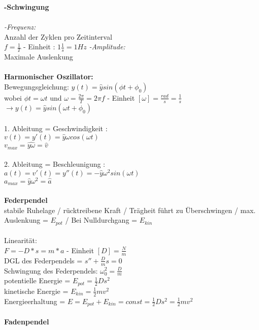 \documentclass[8pt]{article}
\begin{document}
\newpage
\noindent
{\large \textbf{-Schwingung}}\\ \\
\textit{-Frequenz:}\\ Anzahl der Zyklen pro Zeitinterval \\
$f = \frac{1}{T}$ - Einheit : $1 \frac{1}{s} = 1 Hz$ 
\textit{-Amplitude:} \\ Maximale Auslenkung \\ \\
\noindent
\textbf{Harmonischer Oszillator:}\\
Bewegungsgleichung: $y(t) = \hat{y}sin(\phi t+\phi_0) $\\
wobei $\phi t = \omega t$ und $\omega = \frac{2 \pi}{T} = 2\pi f$ - Einheit $[\omega] = \frac{rad}{s} = \frac{1}{s}$ \\
$\rightarrow y(t) = \hat{y}sin(\omega t + \phi_0)$ \\ \\
1. Ableitung = Geschwindigkeit : \\
$v(t) = y'(t) = \hat{y} \omega cos(\omega t)$ \\
$v_{max} = \hat{y \omega} = \hat{v}$ \\ \\
2. Ableitung = Beschleunigung : \\
$a(t) = v'(t) = y''(t) = -\hat{y} \omega^2 sin(\omega t)$ \\
$a_{max}=\hat{y} \omega^2 = \hat{a} $ \\ \\ 
\noindent
\textbf{Federpendel}\\
stabile Ruhelage / rücktreibene Kraft / Trägheit führt zu Überschwingen / max. Auslenkung = $E_{pot}$ / Bei Nulldurchgang = $E_{kin}$ \\ \\
Linearität: \\
$F = -D * s = m * a$ - Einheit $[D] = \frac{N}{m}$ \\
DGL des Federpendels = 
$s'' + \frac{D}{m}s = 0$ \\
Schwingung des Federpendels: $\omega_0^2 = \frac{D}{m}$ \\
potentielle Energie = $E_{pot} = \frac{1}{2}Ds^2$ \\
kinetische Energie = $E_{kin} = \frac{1}{2}mv^2$ \\
Energieerhaltung = $E = E_{pot} + E_{kin} = const = \frac{1}{2}Ds^2 = \frac{1}{2}mv^2$  \\ \\
\noindent
\textbf{Fadenpendel}\\
\end{document}
